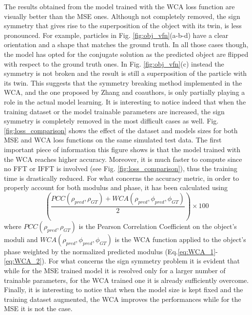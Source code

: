 The results obtained from the model trained with the WCA loss function are visually better than the MSE ones. Although not 
completely removed, the sign symmetry that gives rise to the superposition of the object with its twin, is less pronounced. 
For example, particles in Fig. \ref{fig:obj_vfn}(a-b-d) have a clear orientation and a shape that matches the ground truth. 
In all those cases though, the model has opted for the conjugate solution as the predicted object are flipped with respect to 
the ground truth ones. In Fig. \ref{fig:obj_vfn}(c) instead the symmetry is not broken and the result is still a superposition 
of the particle with its twin. This suggests that the symmetry breaking method implemented in the WCA, and the one proposed by 
Zhang and coauthors, is only partially playing a role in the actual model learning. It is interesting to notice indeed that 
when the training dataset or the model trainable parameters are increased, the sign symmetry is completely removed in the most 
difficult cases as well. Fig. \ref{fig:loss_comparison} shows the effect of the dataset and models sizes for both MSE and WCA 
loss functions on the same simulated test data. The first important piece of information this figure shows is that the model trained 
with the WCA reaches higher accuracy. Moreover, it is much faster to compute since no FFT or IFFT is involved (see Fig. \ref{fig:loss_comparison}), 
thus the training time is drastically reduced. For what concerns the accuracy metric, in order to properly account for 
both modulus and phase, it has been calculated using 
\begin{equation}
 \left(\frac{PCC(\rho_{pred}, \rho_{GT}) + WCA(\rho_{pred},\phi_{pred},\phi_{GT} )}{2}\right)\times 100
 \label{eq:accuracy_phasing}
\end{equation}
where $PCC(\rho_{pred}, \rho_{GT})$ is the Pearson Correlation Coefficient on the object's moduli and $WCA(\rho_{pred},\phi_{pred},\phi_{GT} )$ 
is the WCA function applied to the object's phase weighted by the normalized predicted modulus (Eq.\ref{eq:WCA_1}-\ref{eq:WCA_2}). 
For what concerns the sign symmetry problem it is evident that while for 
the MSE trained model it is resolved only for a larger number of trainable parameters, for the WCA trained one it is already 
sufficiently overcome. Finally, it is interesting to notice that when the model size is kept fixed and the training 
dataset augmented, the WCA improves the performances while for the MSE it is not the case. 

